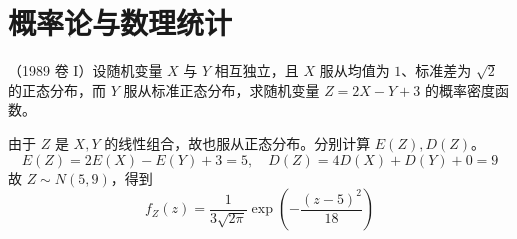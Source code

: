 \section{概率论与数理统计}

\begin{problem}[000062]
（1989 卷 I）设随机变量 $X$ 与 $Y$ 相互独立，且 $X$ 服从均值为 $1$、标准差为 $\sqrt{2}$ 的正态分布，而 $Y$ 服从标准正态分布，求随机变量 $Z = 2X - Y + 3$ 的概率密度函数。
\end{problem}

\begin{solution}
	由于 $Z$ 是 $X, Y$ 的线性组合，故也服从正态分布。分别计算 $E(Z), D(Z)$。
	\[ E(Z) = 2 E(X) - E(Y) + 3 = 5, \quad D(Z) = 4D(X) + D(Y) + 0 = 9 \]
	故 $Z \sim N(5, 9)$，得到
	\[ f_Z(z) = \frac{1}{3 \sqrt{2 \pi}} \exp\left(- \frac{(z-5)^2}{18 }\right) \]
\end{solution}
